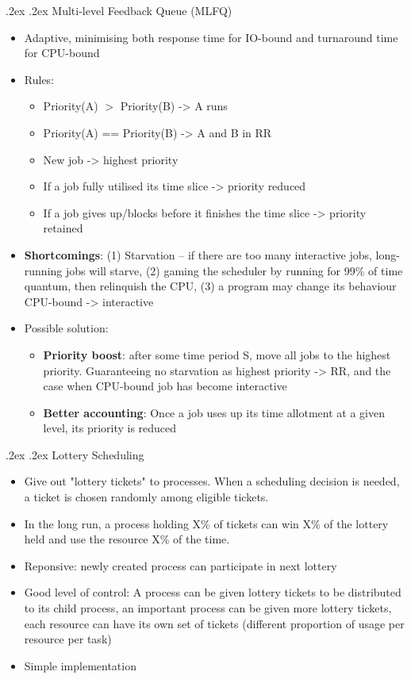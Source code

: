 \documentclass[10pt,landscape,a4paper]{article}
\makeatletter
\renewcommand{\subsubsection}{\@startsection{subsubsection}{1}{0mm}%
  {.2ex}%
  {.2ex}%
{\rmfamily\bfseries}}
\makeatother
\begin{document}
\begin{multicols*}{4}
  \subsubsection{Multi-level Feedback Queue (MLFQ)}
  \begin{itemize}
    \item Adaptive, minimising both response time for IO-bound and turnaround time for CPU-bound
    \item Rules:
    \begin{itemize}
      \item Priority(A) $>$ Priority(B) -> A runs
      \item Priority(A) == Priority(B) -> A and B in RR
      \item New job -> highest priority
      \item If a job fully utilised its time slice -> priority reduced
      \item If a job gives up/blocks before it finishes the time slice -> priority retained
    \end{itemize}
    \item \textbf{Shortcomings}: (1) Starvation -- if there are too many interactive jobs, long-running jobs will starve, (2) gaming the scheduler by running for 99\% of time quantum, then relinquish the CPU, (3) a program may change its behaviour CPU-bound -> interactive
    \item Possible solution:
    \begin{itemize}
      \item \textbf{Priority boost}: after some time period S, move all jobs to the highest priority. Guaranteeing no starvation as highest priority -> RR, and the case when CPU-bound job has become interactive
      \item \textbf{Better accounting}: Once a job uses up its time allotment at a given level, its priority is reduced
    \end{itemize}
  \end{itemize}
  \subsubsection{Lottery Scheduling}
  \begin{itemize}
    \item Give out "lottery tickets" to processes. When a scheduling decision is needed, a ticket is chosen randomly among eligible tickets.
    \item In the long run, a process holding X\% of tickets can win X\% of the lottery held and use the resource X\% of the time.
    \item Reponsive: newly created process can participate in next lottery
    \item Good level of control: A process can be given lottery tickets to be distributed to its child process, an important process can be given more lottery tickets, each resource can have its own set of tickets (different proportion of usage per resource per task)
    \item Simple implementation
  \end{itemize}


\end{multicols*}
\end{document}
